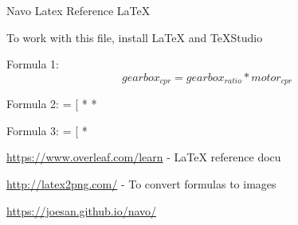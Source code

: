 \documentclass{article}
\begin{document}
Navo Latex Reference \LaTeX

To work with this file, install LaTeX and TeXStudio

Formula 1:
\[ gearbox_{cpr} = gearbox_{ratio} * motor_{cpr} \]

Formula 2:
\rpm = [ *  * \]

Formula 3:
\rpm = [ * \]

\url{https://www.overleaf.com/learn} - LaTeX reference docu

\url{http://latex2png.com/} - To convert formulas to images

\url{https://joesan.github.io/navo/}
\end{document}
